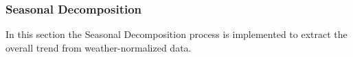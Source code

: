 \subsubsection{Seasonal Decomposition}
\label{sec:seasonaldecomposition}

In this section the Seasonal Decomposition process is implemented to extract the overall trend from weather-normalized data.